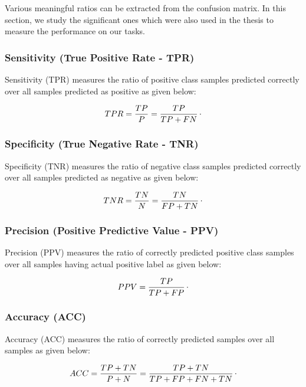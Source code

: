 Various meaningful ratios can be extracted from the confusion matrix. In this section, we study the significant ones which were also used in the thesis to measure the performance on our tasks.

\subsubsection{Sensitivity (True Positive Rate - TPR)}

Sensitivity (TPR) measures the ratio of positive class samples predicted correctly over all samples predicted as positive as given below:

\begin{equation}
\label{eq:TPR}
    TPR = \frac{TP}{P} = \frac{TP}{TP + FN}\raisepunct{.}
\end{equation}

\subsubsection{Specificity (True Negative Rate - TNR)}

Specificity (TNR) measures the ratio of negative class samples predicted correctly over all samples predicted as negative as given below:

\begin{equation}
\label{eq:TNR}
    TNR = \frac{TN}{N} = \frac{TN}{FP + TN}\raisepunct{.}
\end{equation}

\subsubsection{Precision (Positive Predictive Value - PPV)}

Precision (PPV) measures the ratio of correctly predicted positive class samples over all samples having actual positive label as given below:

\begin{equation}
\label{eq:PPV}
    PPV = \frac{TP}{TP + FP}\raisepunct{.}
\end{equation}

\subsubsection{Accuracy (ACC)}

Accuracy (ACC) measures the ratio of correctly predicted samples over all samples as given below:

\begin{equation}
\label{eq:ACC}
    ACC = \frac{TP + TN}{P + N} = \frac{TP + TN}{TP + FP + FN + TN}\raisepunct{.}
\end{equation}

